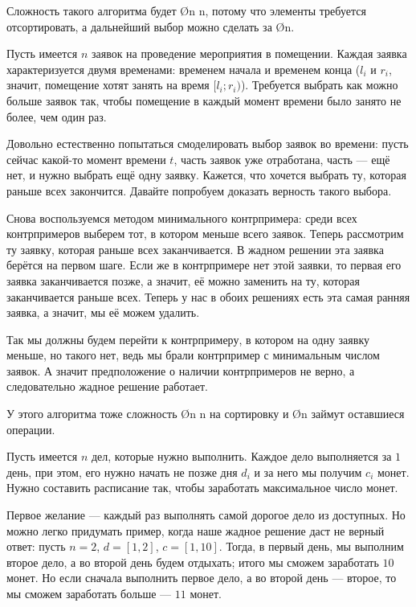 Сложность такого алгоритма будет \O{n \log n}, потому что элементы требуется отсортировать, а дальнейший выбор можно сделать за \O{n}.


Пусть имеется $n$ заявок на проведение мероприятия в помещении. Каждая заявка характеризуется двумя временами: временем начала и временем конца ($l_i$ и $r_i$, значит, помещение хотят занять на время $[l_i; r_i)$). Требуется выбрать как можно больше заявок так, чтобы помещение в каждый момент времени было занято не более, чем один раз.

Довольно естественно попытаться смоделировать выбор заявок во времени: пусть сейчас какой-то момент времени $t$, часть заявок уже отработана, часть — ещё нет, и нужно выбрать ещё одну заявку. Кажется, что хочется выбрать ту, которая раньше всех закончится. Давайте попробуем доказать верность такого выбора.

Снова воспользуемся методом минимального контрпримера: среди всех контрпримеров выберем тот, в котором меньше всего заявок. Теперь рассмотрим ту заявку, которая раньше всех заканчивается. В жадном решении эта заявка берётся на первом шаге. Если же в контрпримере нет этой заявки, то первая его заявка заканчивается позже, а значит, её можно заменить на ту, которая заканчивается раньше всех. Теперь у нас в обоих решениях есть эта самая ранняя заявка, а значит, мы её можем удалить.

Так мы должны будем перейти к контрпримеру, в котором на одну заявку меньше, но такого нет, ведь мы брали контрпример с минимальным числом заявок. А значит предположение о наличии контрпримеров не верно, а следовательно жадное решение работает.

У этого алгоритма тоже сложность \O{n \log n} на сортировку и \O{n} займут оставшиеся операции.


Пусть имеется $n$ дел, которые нужно выполнить. Каждое дело выполняется за $1$ день, при этом, его нужно начать не позже дня $d_i$ и за него мы получим $c_i$ монет. Нужно составить расписание так, чтобы заработать максимальное число монет.

Первое желание — каждый раз выполнять самой дорогое дело из доступных. Но можно легко придумать пример, когда наше жадное решение даст не верный ответ: пусть $n=2$, $d = [1, 2]$, $c = [1, 10]$. Тогда, в первый день, мы выполним второе дело, а во второй день будем отдыхать; итого мы сможем заработать $10$ монет. Но если сначала выполнить первое дело, а во второй день — второе, то мы сможем заработать больше — $11$ монет.

